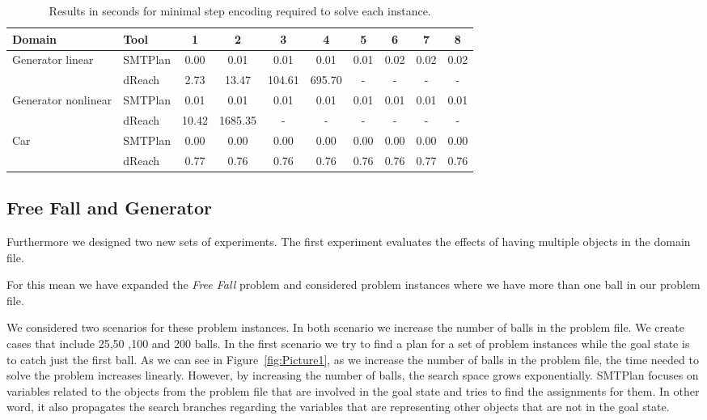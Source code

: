\begin{table}[ht]
\centering
\def\arraystretch{1.1}
\begin{tabular}{|l|l|cccccccc|}
\hline
Domain         & Tool      & 1     & 2    & 3    & 4    & 5    & 6    & 7     & 8     \\
\hline

\multirow{2}{*}{\parbox{6em}{Generator linear}}
               & SMTPlan  & 0.00  & 0.01  & 0.01   & 0.01   & 0.01 & 0.02 & 0.02  & 0.02  \\
               & dReach    & 2.73  & 13.47 & 104.61 & 695.70 & -    & -    & -     & -     \\
\hline \hline
\multirow{2}{*}{\parbox{6em}{Generator nonlinear}}
               & SMTPlan  & 0.01  & 0.01    & 0.01 & 0.01   & 0.01 & 0.01 & 0.01  & 0.01 \\
               & dReach    & 10.42 & 1685.35 & -    & -      & -    & -    & -     & -    \\
\hline \hline
\multirow{2}{*}{\parbox{6em}{Car}}
               & SMTPlan  & 0.00  & 0.00 & 0.00 & 0.00 & 0.00 & 0.00 & 0.00 & 0.00  \\
               & dReach    & 0.77  & 0.76 & 0.76 & 0.76 & 0.76 & 0.76 & 0.77 & 0.76  \\
\hline
\end{tabular}
\caption{Results in seconds for minimal step encoding required to solve each instance.}
\label{tab:finalstep}
\end{table}

\subsection{Free Fall and Generator}\label{sec:eval_objects}

Furthermore we designed two new sets of experiments. The first experiment evaluates the effects of having multiple objects in the domain file. 

\smallskip

For this mean we have expanded the \textit{Free Fall} problem and considered problem instances where we have more than one ball in our problem file.  

We considered two scenarios for these problem instances. In both scenario we increase the number of balls in the problem file. We create cases that include 25,50 ,100 and 200 balls. In the first scenario we try to find a plan for a set of problem instances while the goal state is to catch just the first ball. As we can see in Figure~\ref{fig:Picture1}, as we increase the number of balls in the problem file, the time needed to solve the problem increases linearly. However, by increasing the number of balls, the search space grows exponentially. SMTPlan focuses on variables related to the objects from the problem file that are involved in the goal state and tries to find the assignments for them. In other word, it also propagates the search branches regarding the variables that are representing other objects that are not in the goal state.


